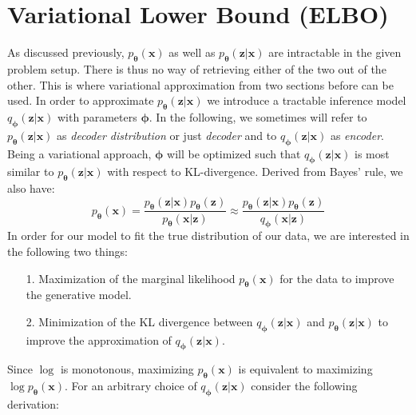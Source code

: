\documentclass[12pt]{report}
\theoremstyle{definition}
\begin{document}
\section{Variational Lower Bound (ELBO)}
As discussed previously, $p_{\pmb{\theta}}(\mathbf{x})$ as well as $p_{\pmb{\theta}}(\mathbf{z}|\mathbf{x})$ are intractable in the given problem setup. There is thus no way of retrieving either of the two out of the other. This is where variational approximation from two sections before can be used. In order to approximate $p_{\pmb{\theta}}(\mathbf{z}|\mathbf{x})$ we introduce a tractable inference model $q_{\pmb{\phi}}(\mathbf{z}|\mathbf{x})$ with parameters $\pmb{\phi}$. In the following, we sometimes will refer to $p_{\pmb{\theta}}(\mathbf{z}|\mathbf{x})$ as \emph{decoder distribution} or just \emph{decoder} and to $q_{\pmb{\phi}}(\mathbf{z}|\mathbf{x})$ as \emph{encoder}. Being a variational approach,  $\pmb{\phi}$ will be optimized such that $q_{\pmb{\phi}}(\mathbf{z}|\mathbf{x})$ is most similar to $p_{\pmb{\theta}}(\mathbf{z}|\mathbf{x})$ with respect to KL-divergence.
Derived from Bayes' rule, we also have:
\begin{equation}
	p_{\pmb{\theta}}(\mathbf{x}) = \frac{p_{\pmb{\theta}}(\mathbf{z}|\mathbf{x}) p_{\pmb{\theta}}(\mathbf{z})}{p_{\pmb{\theta}}(\mathbf{x}|\mathbf{z})} \approx  \frac{p_{\pmb{\theta}}(\mathbf{z}|\mathbf{x}) p_{\pmb{\theta}}(\mathbf{z})}{q_{\pmb{\phi}}(\mathbf{x}|\mathbf{z})}
\end{equation}
In order for our model to fit the true distribution of our data, we are interested in the following two things:
\begin{itemize}
	\item[1.] Maximization of the marginal likelihood $p_{\pmb{\theta}}(\mathbf{x})$ for the data to improve the generative model.
	\item[2.] Minimization of the KL divergence between $q_{\pmb{\phi}}(\mathbf{z}|\mathbf{x})$ and $p_{\pmb{\theta}}(\mathbf{z}|\mathbf{x})$ to improve the approximation of $q_{\pmb{\phi}}(\mathbf{z}|\mathbf{x})$.
\end{itemize}
Since $\log$ is monotonous, maximizing $p_{\pmb{\theta}}(\mathbf{x})$ is equivalent to maximizing $\log p_{\pmb{\theta}}(\mathbf{x})$. For an arbitrary choice of $q_{\pmb{\phi}}(\mathbf{z}|\mathbf{x})$ consider the following derivation:
\end{document}
